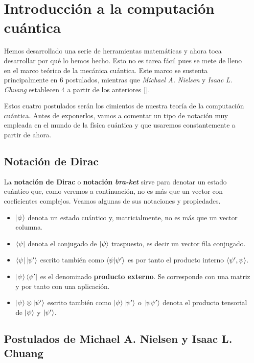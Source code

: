 \chapter{Introducción a la computación cuántica}

Hemos desarrollado una serie de herramientas matemáticas y ahora toca desarrollar por qué lo hemos hecho. Esto no es tarea fácil pues se mete de lleno en el marco teórico de la mecánica cuántica. Este marco se sustenta principalmente en 6 postulados, mientras que \textit{Michael A. Nielsen} y \textit{Isaac L. Chuang} establecen 4 a partir de los anteriores [\cite{nielsen2001quantum}].

Estos cuatro postulados serán los cimientos de nuestra teoría de la computación cuántica. Antes de exponerlos, vamos a comentar un tipo de notación muy empleada en el mundo de la física cuántica y que usaremos constantemente a partir de ahora.

\section{Notación de Dirac}

La \textbf{notación de Dirac} o \textbf{notación \textit{bra-ket}} sirve para denotar un estado cuántico que, como veremos a continuación, no es más que un vector con coeficientes complejos. Veamos algunas de sus notaciones y propiedades.
\begin{itemize}
\item $\left|\psi\right\rangle$ denota un estado cuántico y, matricialmente, no es más que un vector columna.
\item $\left\langle\psi\right|$ denota el conjugado de $\left|\psi\right\rangle$ traspuesto, es decir un vector fila conjugado.
\item $\left\langle\psi\right|\left|\psi'\right\rangle$ escrito también como $\left\langle\psi|\psi'\right\rangle$ es por tanto el producto interno $\langle\psi',\psi\rangle$.

\item $\left|\psi\right\rangle\left\langle\psi'\right|$ es el denominado \textbf{producto externo}. Se corresponde con una matriz y por tanto con una aplicación.

\item $\left|\psi\right\rangle\otimes\left|\psi'\right\rangle$ escrito también como $\left|\psi\right\rangle\left|\psi'\right\rangle$ o $\left|\psi\psi'\right\rangle$ denota el producto tensorial de $\left|\psi\right\rangle$ y $\left|\psi'\right\rangle$.
\end{itemize}

\section{Postulados de Michael A. Nielsen y Isaac L. Chuang}

